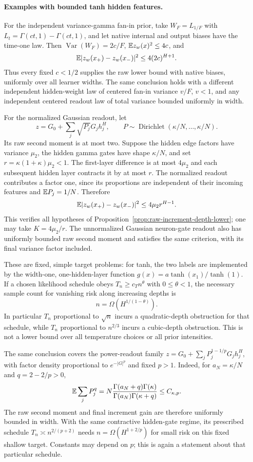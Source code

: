 \paragraph{Examples with bounded tanh hidden features.}
For the independent variance-gamma fan-in prior, take
$W_F=L_{1/F}$ with
$L_t=\Gamma(ct,1)-\Gamma(ct,1)$, and let native internal and output biases
have the time-one law. Then
$\operatorname{Var}(W_F)=2c/F$,
$\mathbb E z_w(x)^2\le4c$, and
\[
 \mathbb E|z_w(x_+)-z_w(x_-)|^2\le4(2c)^{H+1}.
\]
Thus every fixed $c<1/2$ supplies the raw lower bound with native biases,
uniformly over all learner widths. The same conclusion holds with a
different independent hidden-weight law of centered fan-in variance
$v/F$, $v<1$, and any independent centered readout law of total variance
bounded uniformly in width.

For the normalized Gaussian readout, let
\[
 z=G_0+\sum_j\sqrt{P_j}G_jh_j^H,
 \qquad P\sim\operatorname{Dirichlet}(\kappa/N,\ldots,\kappa/N).
\]
Its raw second moment is at most two. Suppose the hidden edge factors
have variance $\mu_2$, the hidden gamma gates have shape $\kappa/N$,
and set $r=\kappa(1+\kappa)\mu_2<1$.
The first-layer difference is at most $4\mu_2$ and each subsequent hidden
layer contracts it by at most $r$. The normalized readout contributes
a factor one, since its proportions are independent of their incoming
features and $\mathbb E P_j=1/N$. Therefore
\[
 \mathbb E|z_w(x_+)-z_w(x_-)|^2
 \le4\mu_2r^{H-1}.
\]
This verifies all hypotheses of Proposition~\ref{prop:raw-increment-depth-lower};
one may take $K=4\mu_2/r$.
The unnormalized Gaussian neuron-gate readout also has uniformly bounded
raw second moment and satisfies the same criterion, with its final
variance factor included.

These are fixed, simple target problems: for tanh, the two labels are
implemented by the width-one, one-hidden-layer function
$g(x)=a\tanh(x_1)/\tanh(1)$.
If a chosen likelihood schedule obeys $T_n\ge c_T n^\theta$ with
$0\le\theta<1$, the necessary sample count for vanishing risk along
increasing depths is
\[
 n=\Omega\!\left(H^{1/(1-\theta)}\right).
\]
In particular $T_n$ proportional to $\sqrt n$ incurs a quadratic-depth
obstruction for that schedule, while $T_n$ proportional to $n^{2/3}$
incurs a cubic-depth obstruction. This is not a lower bound over all
temperature choices or all prior intensities.

The same conclusion covers the power-readout family
$z=G_0+\sum_jP_j^{1-1/p}G_jh_j^H$, with factor density proportional
to $e^{-|G|^p}$ and fixed $p>1$.
Indeed, for $a_N=\kappa/N$ and $q=2-2/p>0$,
\[
 \mathbb E\sum_jP_j^q=
 N\frac{\Gamma(a_N+q)\Gamma(\kappa)}
         {\Gamma(a_N)\Gamma(\kappa+q)}
 \le C_{\kappa,p}.
\]
The raw second moment and final increment gain are therefore uniformly
bounded in width. With the same contractive hidden-gate regime, its
prescribed schedule $T_n\asymp n^{2/(p+2)}$ needs
$n=\Omega(H^{1+2/p})$ for small risk on this fixed shallow target.
Constants may depend on $p$; this is again a statement about that
particular schedule.

